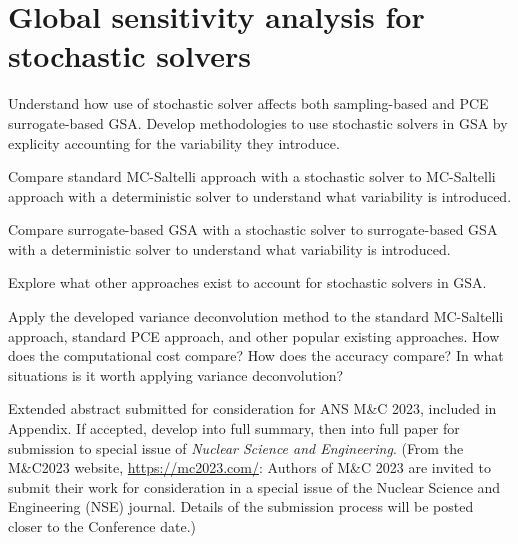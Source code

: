 \section{Global sensitivity analysis for stochastic solvers}
 Understand how use of stochastic solver affects both sampling-based and PCE surrogate-based GSA. Develop methodologies to use stochastic solvers in GSA by explicity accounting for the variability they introduce.
\begin{todolist}
    \item Compare standard MC-Saltelli approach with a stochastic solver to MC-Saltelli approach with a deterministic solver to understand what variability is introduced.
    \item Compare surrogate-based GSA with a stochastic solver to surrogate-based GSA with a deterministic solver to understand what variability is introduced.
    \item Explore what other approaches exist to account for stochastic solvers in GSA. 
    \item Apply the developed variance deconvolution method to the standard MC-Saltelli approach, standard PCE approach, and other popular existing approaches. How does the computational cost compare? How does the accuracy compare? In what situations is it worth applying variance deconvolution? 
    \item Extended abstract submitted for consideration for ANS M\&C 2023, included in Appendix. If accepted, develop into full summary, then into full paper for submission to special issue of \textit{Nuclear Science and Engineering}. (From the M\&C2023 website, \url{https://mc2023.com/}: Authors of M\&C 2023 are invited to submit their work for consideration in a special issue of the Nuclear Science and Engineering (NSE) journal. Details of the submission process will be posted closer to the Conference date.)
\end{todolist}


